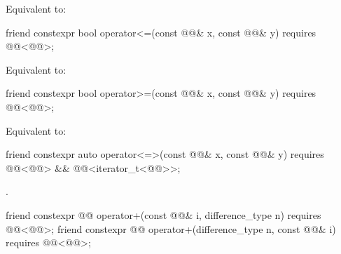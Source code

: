 \begin{itemdescr}
\pnum
\effects
Equivalent to: 
\end{itemdescr}

%
\begin{itemdecl}
friend constexpr bool operator<=(const @@& x, const @@& y)
  requires @@<@@>;
\end{itemdecl}

\begin{itemdescr}
\pnum
\effects
Equivalent to: 
\end{itemdescr}

%
\begin{itemdecl}
friend constexpr bool operator>=(const @@& x, const @@& y)
  requires @@<@@>;
\end{itemdecl}

\begin{itemdescr}
\pnum
\effects
Equivalent to: 
\end{itemdescr}

%
\begin{itemdecl}
friend constexpr auto operator<=>(const @@& x, const @@& y)
  requires @@<@@> && @@<iterator_t<@@>>;
\end{itemdecl}

\begin{itemdescr}
\pnum
\returns
{}.
\end{itemdescr}

%
\begin{itemdecl}
friend constexpr @@ operator+(const @@& i, difference_type n)
  requires @@<@@>;
friend constexpr @@ operator+(difference_type n, const @@& i)
  requires @@<@@>;
\end{itemdecl}


